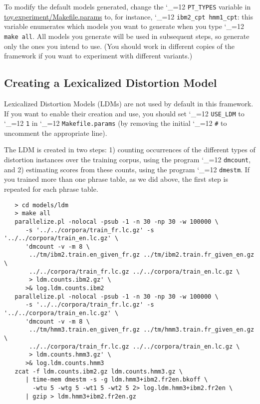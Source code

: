 \documentclass[11pt,letterpaper]{article}
\def\code{\begingroup\catcode`\_=12 \codex}
\newcommand{\codex}[1]{\texttt{#1}\endgroup}
\begin{document}
To modify the default models generated, change the \code{PT_TYPES} variable
in \url{toy.experiment/Makefile.params} to, for instance, \code{ibm2_cpt
hmm1_cpt}: this variable enumerates which models you want to generate when you
type \code{make all}. All models you generate will be used in subsequent
steps, so generate only the ones you intend to use. (You should work in
different copies of the framework if you want to experiment with different
variants.)

\subsection{Creating a Lexicalized Distortion Model} \label{LDM}

Lexicalized Distortion Models (LDMs) are not used by default in this
framework.  If you want to enable their creation and use, you should set
\code{USE_LDM} to \code{1} in \code{Makefile.params} (by removing the initial
\code{\#} to uncomment the appropriate line).

The LDM is created in two steps: 1) counting occurrences of the different types
of distortion instances over the training corpus, using the program
\code{dmcount}, and 2) estimating scores from these counts, using the program
\code{dmestm}.  If you trained more than one phrase table, as we did above,
the first step is repeated for each phrase table.
\begin{small}
\begin{verbatim}
   > cd models/ldm
   > make all
   parallelize.pl -nolocal -psub -1 -n 30 -np 30 -w 100000 \
      -s '../../corpora/train_fr.lc.gz' -s '../../corpora/train_en.lc.gz' \
      'dmcount -v -m 8 \
       ../tm/ibm2.train.en_given_fr.gz ../tm/ibm2.train.fr_given_en.gz \
       ../../corpora/train_fr.lc.gz ../../corpora/train_en.lc.gz \
       > ldm.counts.ibm2.gz' \
      >& log.ldm.counts.ibm2
   parallelize.pl -nolocal -psub -1 -n 30 -np 30 -w 100000 \
      -s '../../corpora/train_fr.lc.gz' -s '../../corpora/train_en.lc.gz' \
      'dmcount -v -m 8 \
       ../tm/hmm3.train.en_given_fr.gz ../tm/hmm3.train.fr_given_en.gz \
       ../../corpora/train_fr.lc.gz ../../corpora/train_en.lc.gz \
       > ldm.counts.hmm3.gz' \
      >& log.ldm.counts.hmm3
   zcat -f ldm.counts.ibm2.gz ldm.counts.hmm3.gz \
      | time-mem dmestm -s -g ldm.hmm3+ibm2.fr2en.bkoff \
        -wtu 5 -wtg 5 -wt1 5 -wt2 5 2> log.ldm.hmm3+ibm2.fr2en \
      | gzip > ldm.hmm3+ibm2.fr2en.gz
\end{verbatim}
\end{small}
\end{document}

